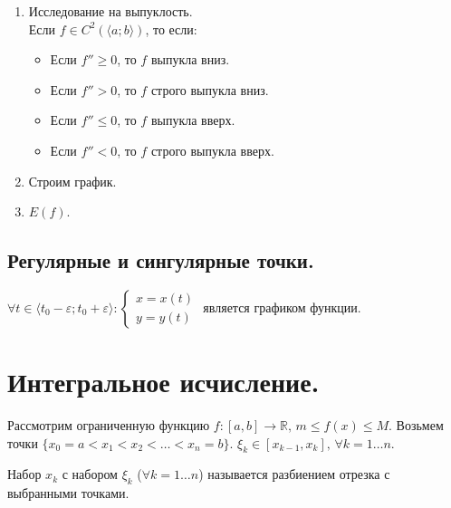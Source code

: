 \documentclass[12pt]{article}
\begin{document}
\begin{enumerate}
		\begin{theorem}
			Пусть $f \uparrow$ на $\langle a; b \rangle$ и дифференцируема на $\langle a; b \rangle$ $\Rightarrow$ $f' \geqslant 0$ на $\langle a; b \rangle$.
		\end{theorem}
		\begin{proof}
			$f'(x) = \lim\limits_{\varDelta x \to 0} \dfrac{f(x + \varDelta x) - f(x)}{\varDelta x} \geqslant 0$.
		\end{proof}
		\item Исследование на выпуклость.\\
		Если $f \in C^2(\langle a; b \rangle)$, то если:
		\begin{itemize}
			\item Если $f'' \geqslant 0$, то $f$ выпукла вниз.
			\item Если $f'' > 0$, то $f$ строго выпукла вниз.
			\item Если $f'' \leqslant 0$, то $f$ выпукла вверх.
			\item Если $f'' < 0$, то $f$ строго выпукла вверх.
		\end{itemize}
		\item Строим график.
		\item $E(f)$.
	\end{enumerate}
	
	\subsection{Регулярные и сингулярные точки.}
	
	\begin{definition}
		$\forall t \in \langle t_0 - \varepsilon; t_0 + \varepsilon \rangle: \begin{cases}
			x = x(t)\\
			y = y(t)
		\end{cases}$ является графиком функции.
	\end{definition}
	
	\section{Интегральное исчисление.}
	
	Рассмотрим ограниченную функцию $f: [a, b] \rightarrow \mathbb{R}, \, m \leqslant f(x) \leqslant M$. Возьмем точки $\{ x_0 = a < x_1 < x_2 < \dots < x_n = b \}$. $\xi_k \in [x_{k - 1}, x_k], \, \forall k = 1 \dots n$.
	
	\begin{definition}
		Набор $x_k$ с набором $\xi_k$ ($\forall k = 1 \dots n$) называется разбиением отрезка с выбранными точками.
	\end{definition}
	
\end{document}
